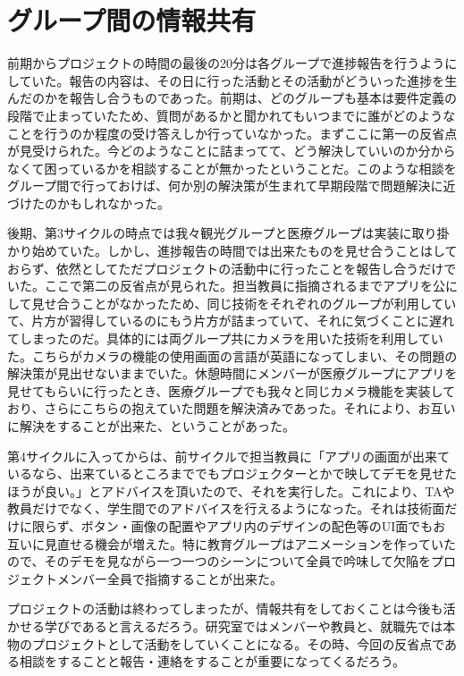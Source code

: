\section{グループ間の情報共有}
前期からプロジェクトの時間の最後の20分は各グループで進捗報告を行うようにしていた。報告の内容は、その日に行った活動とその活動がどういった進捗を生んだのかを報告し合うものであった。前期は、どのグループも基本は要件定義の段階で止まっていたため、質問があるかと聞かれてもいつまでに誰がどのようなことを行うのか程度の受け答えしか行っていなかった。まずここに第一の反省点が見受けられた。今どのようなことに詰まってて、どう解決していいのか分からなくて困っているかを相談することが無かったということだ。このような相談をグループ間で行っておけば、何か別の解決策が生まれて早期段階で問題解決に近づけたのかもしれなかった。
\par 後期、第3サイクルの時点では我々観光グループと医療グループは実装に取り掛かり始めていた。しかし、進捗報告の時間では出来たものを見せ合うことはしておらず、依然としてただプロジェクトの活動中に行ったことを報告し合うだけでいた。ここで第二の反省点が見られた。担当教員に指摘されるまでアプリを公にして見せ合うことがなかったため、同じ技術をそれぞれのグループが利用していて、片方が習得しているのにもう片方が詰まっていて、それに気づくことに遅れてしまったのだ。具体的には両グループ共にカメラを用いた技術を利用していた。こちらがカメラの機能の使用画面の言語が英語になってしまい、その問題の解決策が見出せないままでいた。休憩時間にメンバーが医療グループにアプリを見せてもらいに行ったとき、医療グループでも我々と同じカメラ機能を実装しており、さらにこちらの抱えていた問題を解決済みであった。それにより、お互いに解決をすることが出来た、ということがあった。
\par 第4サイクルに入ってからは、前サイクルで担当教員に「アプリの画面が出来ているなら、出来ているところまででもプロジェクターとかで映してデモを見せたほうが良い。」とアドバイスを頂いたので、それを実行した。これにより、TAや教員だけでなく、学生間でのアドバイスを行えるようになった。それは技術面だけに限らず、ボタン・画像の配置やアプリ内のデザインの配色等のUI面でもお互いに見直せる機会が増えた。特に教育グループはアニメーションを作っていたので、そのデモを見ながら一つ一つのシーンについて全員で吟味して欠陥をプロジェクトメンバー全員で指摘することが出来た。
\par プロジェクトの活動は終わってしまったが、情報共有をしておくことは今後も活かせる学びであると言えるだろう。研究室ではメンバーや教員と、就職先では本物のプロジェクトとして活動をしていくことになる。その時、今回の反省点である相談をすることと報告・連絡をすることが重要になってくるだろう。
